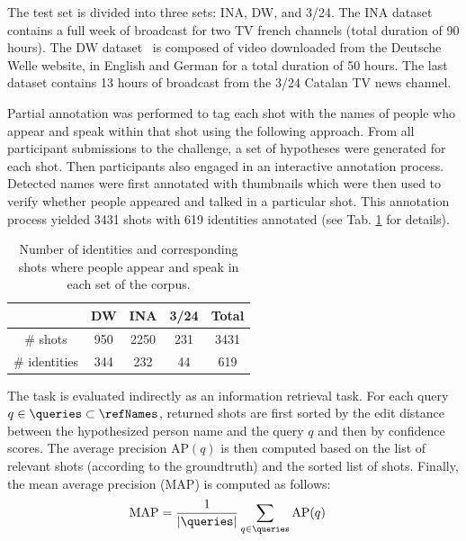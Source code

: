  The test set is divided into three sets: INA, DW, and 3/24. The INA dataset contains a full week of broadcast for two TV french channels (total duration of 90 hours). The DW dataset~\cite{EUMSSI} is composed of video downloaded from the Deutsche Welle website, in English and German for a total duration of 50 hours. The last dataset contains 13 hours of broadcast from the 3/24 Catalan TV news channel. 

Partial annotation was performed to tag each shot with the names of people who appear and speak within that shot using the following approach.
%
From all participant submissions to the challenge, a set of hypotheses were generated for each shot. 
Then participants also engaged in an interactive annotation process.
Detected names were first annotated with  thumbnails which were then used to verify whether people appeared and talked in a particular shot. 
This annotation process yielded 3431 shots with 619 identities annotated (see Tab. \ref{tab:stats} for details).

\begin{table}[tb]
\centering
\caption{Number of identities and corresponding shots where people appear and speak in each set of the corpus.}
\vspace*{-2mm}
\begin{tabular}{c|c|c|c|c|}
\cline{2-5}
    						   		& DW  	& INA 	& 3/24  & Total\\ \hline
 \multicolumn{1}{|c|}{\# shots} 		& 950	& 2250  & 231 & 3431\\ \hline

 \multicolumn{1}{|c|}{\# identities} 	& 344	& 232   & 44 & 619 \\ \hline
								
\end{tabular}
%
\vspace*{-5mm}
\label{tab:stats}
\end{table}



 The task is evaluated indirectly as an information retrieval task. %
%
For each query $q \in \queries \subset \refNames$, returned shots are first sorted by the edit distance between the hypothesized person name and the query $q$ and then by confidence scores.
The average precision $\text{AP}(q)$ is then computed based on the list of relevant shots (according to the groundtruth) and the sorted list of shots. Finally, the mean average precision (MAP) is computed as follows:
\begin{align}
            \text{MAP} & = \frac{1}{|\queries|} \sum_{q \in \queries} \text{AP}(q) \nonumber
\end{align}

